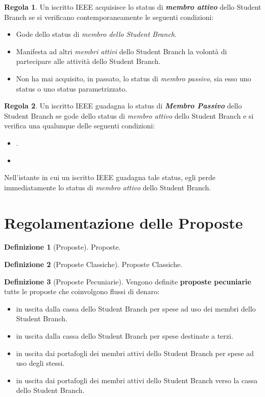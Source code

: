 \documentclass[pdf]{article}
\theoremstyle{definition}
\newtheorem{defn}{Definizione}[section]
\newtheorem{regl}{Regola}[section]
\renewcommand{\i}[1]{\textit{#1}}
\renewcommand{\b}[1]{\textbf{#1}}
\begin{document}
\begin{regl}
	Un iscritto IEEE acquisisce lo status di \b{\i{membro attivo}} dello Student Branch se si verificano contemporaneamente le seguenti condizioni:
	\begin{itemize}
		\item Gode dello status di \i{membro dello Student Branch}.
		\item Manifesta ad altri \i{membri attivi} dello Student Branch la volontà di partecipare alle attività dello Student Branch.
		\item Non ha mai acquisito, in passato, lo status di \i{membro passivo}, sia esso uno status o uno status parametrizzato.
	\end{itemize}
\end{regl}


\begin{regl}
	Un iscritto IEEE guadagna lo status di \b{\i{Membro Passivo}} dello Student Branch se gode dello status di \i{membro attivo} dello Student Branch e si verifica una qualunque delle seguenti condizioni:
	\begin{itemize}
		\item .
		\item 
	\end{itemize}
	Nell'istante in cui un iscritto IEEE guadagna tale status, egli perde immediatamente lo status di \i{membro attivo} dello Student Branch.
\end{regl}

\section{Regolamentazione delle Proposte}


\begin{defn}[Proposte]
	Proposte.
\end{defn}

\begin{defn}[Proposte Classiche]
	Proposte Classiche.
\end{defn}

\begin{defn}[Proposte Pecuniarie]
	Vengono definite \textbf{proposte pecuniarie} tutte le proposte che coinvolgono flussi di denaro:
	\begin{itemize}
		\item in uscita dalla cassa dello Student Branch per spese ad uso dei membri dello Student Branch.
		\item in uscita dalla cassa dello Student Branch per spese destinate a terzi.
		\item in uscita dai portafogli dei membri attivi dello Student Branch per spese ad uso degli stessi. %
		\item in uscita dai portafogli dei membri attivi dello Student Branch verso la cassa dello Student Branch.
	\end{itemize}
\end{defn}
\end{document}
